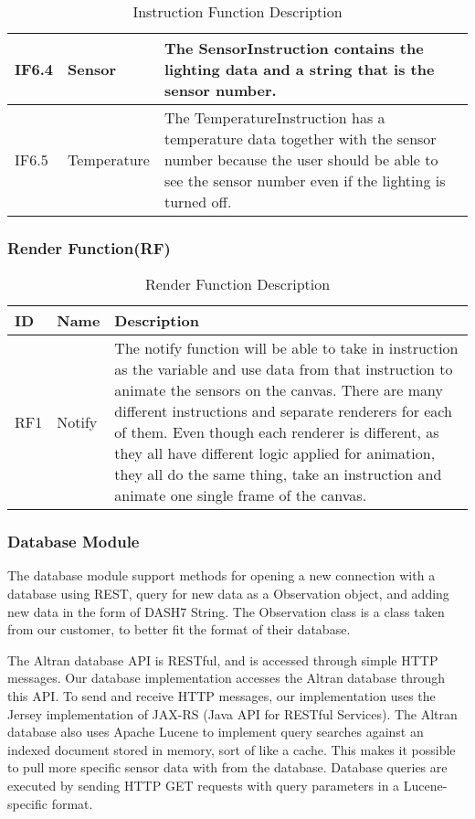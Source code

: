 \documentclass[../document]{subfiles}
\begin{document}
\begin{table}[H]
\caption{Instruction Function Description}
\centering
\begin{tabularx}{\textwidth}{|L{1.2cm}|L{3.5cm}|X|}
	\hline
	IF6.4
	&Sensor
	&The SensorInstruction contains the lighting data and a string that is the sensor number.
	\\ \hline IF6.5
	&Temperature
	&The TemperatureInstruction has a temperature data together with the sensor number because the user should be able to see the sensor number even if the lighting is turned off.
	\\ \hline 
\end{tabularx}
\end{table}

\subsubsection{Render Function(RF)}
\begin{table}[H]
\caption{Render Function Description}
\centering
\begin{tabularx}{\textwidth}{|L{1.2cm}|L{3.5cm}|X|}
	\hline
	ID
	&Name
	&Description
	\\ \hline RF1
	&Notify
	&The notify function will be able to take in instruction as the variable and use data from that instruction to animate the sensors on the canvas. There are many different instructions and separate renderers for each of them. Even though each renderer is different, as they all have different logic applied for animation, they all do the same thing, take an instruction and animate one single frame of the canvas.
	\\ \hline 
\end{tabularx}
\end{table}

\subsubsection{Database Module}
The database module support methods for opening a new connection with a database using REST, query for new data as a Observation object, and adding new data in the form of DASH7 String. The Observation class is a class taken from our customer, to better fit the format of their database.

The Altran database API is RESTful, and is accessed through simple HTTP messages. Our database implementation accesses the Altran database through this API. To send and receive HTTP messages, our implementation uses the Jersey implementation of JAX-RS (Java API for RESTful Services). The Altran database also uses Apache Lucene to implement query searches against an indexed document stored in memory, sort of like a cache. This makes it possible to pull more specific sensor data with from the database. Database queries are executed by sending HTTP GET requests with query parameters in a Lucene-specific format.
\end{document}

